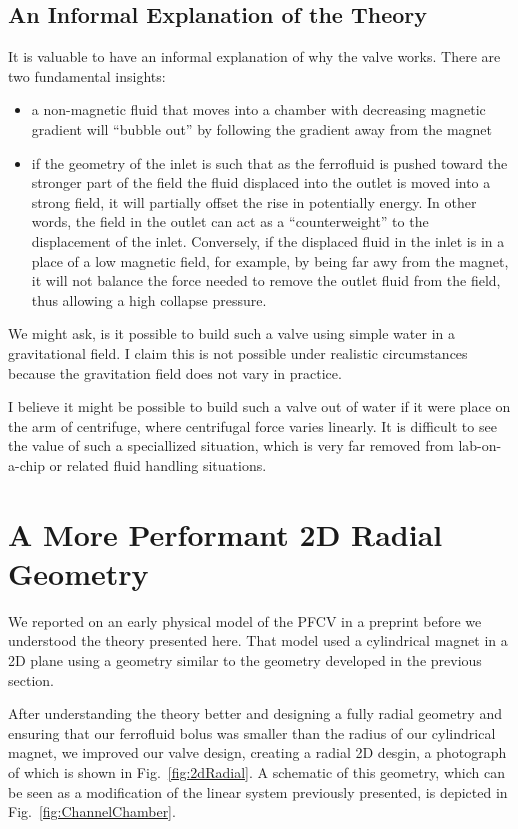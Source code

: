 \documentclass{asme2ej}
\begin{document}
\subsection{An Informal Explanation of the Theory}

It is valuable to have an informal explanation of why
the valve works.
There are two fundamental insights:
\begin{itemize}
\item a non-magnetic fluid that moves into a chamber with
  decreasing magnetic gradient will ``bubble out'' by following
  the gradient away from the magnet
\item if the geometry of the inlet is such that as
  the ferrofluid is pushed toward the stronger part of the field
  the fluid displaced into the outlet is moved into a strong field,
  it will partially offset the rise in potentially energy.
  In other words, the field in the outlet can act as a
  ``counterweight'' to the displacement of the inlet.
  Conversely, if the displaced fluid in the inlet is in
  a place of a low magnetic field, for example, by being
  far awy from the magnet, it will not balance the force
  needed to remove the outlet fluid from the field,
  thus allowing a high collapse pressure.
\end{itemize}

We might ask, is it possible to build such a valve
using simple water in a gravitational field.
I claim this is not possible under realistic circumstances
because the gravitation field does not vary in practice.

I believe it might be possible to build such a valve
out of water if it were place on the arm of centrifuge,
where centrifugal force varies linearly.
It is difficult to see the value of such a speciallized
situation, which is very far removed from lab-on-a-chip
or related fluid handling situations.

\section{ A More Performant 2D Radial Geometry  }

We reported on an early physical model of the PFCV in a
preprint\cite{stuckeyPreprint}
before we understood the theory presented here.
That model used a cylindrical magnet in a 2D plane using a
geometry similar to the geometry developed in the previous section.


After understanding the theory better and designing a fully
radial geometry and ensuring that our ferrofluid bolus
was smaller than the radius of our cylindrical magnet,
we improved our valve design, creating a radial 2D desgin,
a photograph of which is shown in Fig.~\ref{fig:2dRadial}.
A schematic of this geometry, which can be seen as
a modification of the linear system previously presented,
is depicted in Fig.~\ref{fig:ChannelChamber}.
\end{document}
